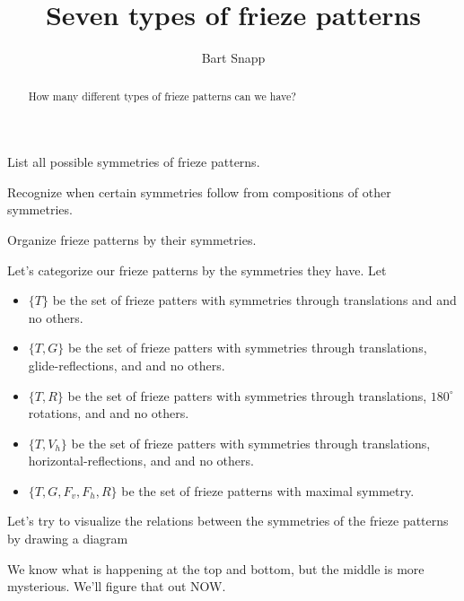 \documentclass[noauthor,nooutcomes,12pt,hints]{ximera}
\author{Bart Snapp}
\title{Seven types of frieze patterns}
\begin{document}
\begin{abstract}
  How many different types of frieze patterns can we have?
\end{abstract}
\maketitle

\begin{listOutcomes}
\item List all possible symmetries of frieze patterns.
\item Recognize when certain symmetries follow from compositions of
  other symmetries.
\item Organize frieze patterns by their symmetries.
\end{listOutcomes}



Let's categorize our frieze patterns by the symmetries they have. Let
\begin{itemize}
  \item $\{T\}$ be the set of frieze patters with symmetries through
    translations and and no others.
  \item $\{T,G\}$ be the set of frieze patters with symmetries through
    translations, glide-reflections, and and no others.
  \item $\{T,R\}$ be the set of frieze patters with symmetries through
    translations, $180^\circ$ rotations, and and no others.
  \item $\{T,V_h\}$ be the set of frieze patters with symmetries
    through translations, horizontal-reflections, and and no
    others.
  \item $\{T,G,F_v,F_h,R\}$ be the set of frieze patterns with maximal
    symmetry.
\end{itemize}
Let's try to visualize the relations between the symmetries of the
frieze patterns by drawing a diagram
\begin{center}
\end{center}
We know what is happening at the top and bottom, but the middle is
more mysterious. We'll figure that out NOW.
\end{document}
